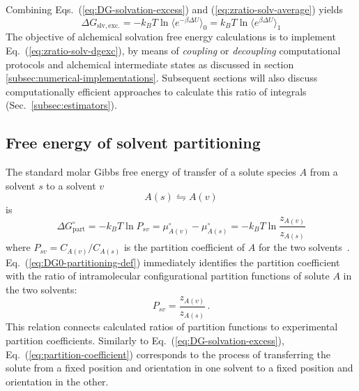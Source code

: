 \documentclass[9pt,bestpractices]{livecoms}
\begin{document}
Combining Eqs.~(\ref{eq:DG-solvation-excess}) and (\ref{eq:zratio-solv-average}) yields\cite{widom1982potential} 
\begin{equation}
  \Delta G_{\mathrm{slv, exc.}} = - k_B T \ln \langle e^{-\beta \Delta U} \rangle_0 = k_B T \ln \langle e^{\beta \Delta U} \rangle_1
  \label{eq:zratio-solv-dgexc}
\end{equation}
The objective of alchemical solvation free energy calculations is to implement Eq.~(\ref{eq:zratio-solv-dgexc}), by means of \emph{coupling} or \emph{decoupling} computational protocols and alchemical intermediate states as discussed in section \ref{subsec:numerical-implementations}.  Subsequent sections will also discuss computationally efficient approaches to calculate this ratio of integrals (Sec.~\ref{subsec:estimators}).

\subsection{Free energy of solvent partitioning}\label{sec:theory-partitioning}

The standard molar Gibbs free energy of transfer of a solute species $A$ from a  solvent $s$ to a solvent $v$
\begin{equation}
A(s)  \leftrightharpoons A(v)
\end{equation}
is
\begin{equation}
  \Delta G^\circ_{\mathrm{part}} = -k_B T \ln P_{sv} = \mu^\circ_{A(v)}  - \mu^\circ_{A(s)} = -k_B T \ln \frac{z_{A(v)}}{z_{A(s)}}
  \label{eq:DG0-partitioning-def}
\end{equation}
where $P_{sv} = C_{A(v)}/C_{A(s)}$ is the partition coefficient of $A$ for the two solvents~\cite{rustenburg2016measuring}. Eq.~(\ref{eq:DG0-partitioning-def}) 
immediately identifies the partition coefficient with the ratio of intramolecular configurational partition functions of solute $A$ in the two solvents:
\begin{equation}
  P_{sv} = \frac{z_{A(v)}}{z_{A(s)}} \, .
  \label{eq:partition-coefficient}
\end{equation}
This relation connects calculated ratios of partition functions to experimental partition coefficients. Similarly to Eq.~(\ref{eq:DG-solvation-excess}), Eq.~(\ref{eq:partition-coefficient}) corresponds to the process of transferring the solute from a fixed position and orientation in one solvent to a fixed position and orientation in the other.
\end{document}
